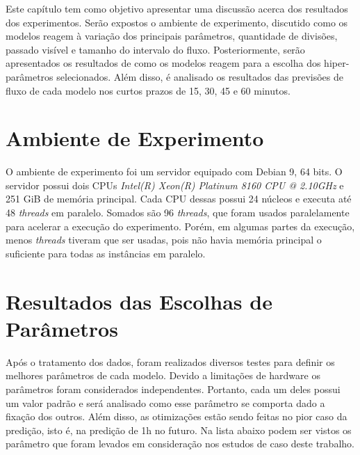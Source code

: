 Este capítulo tem como objetivo apresentar uma discussão acerca dos resultados dos experimentos. Serão expostos o ambiente de experimento, discutido como os modelos reagem à variação dos principais parâmetros, quantidade de divisões, passado visível e tamanho do intervalo do fluxo. Posteriormente, serão apresentados os resultados de como os modelos reagem para a escolha dos hiper-parâmetros selecionados. Além disso, é analisado os resultados das previsões de fluxo de cada modelo nos curtos prazos de 15, 30, 45 e 60 minutos.


\section{Ambiente de Experimento}

O ambiente de experimento foi um servidor equipado com Debian 9, 64 bits. O servidor possui dois CPUs \textit{Intel(R) Xeon(R) Platinum 8160 CPU @ 2.10GHz} e 251 GiB de memória principal. Cada CPU dessas possui 24 núcleos e executa até 48 \textit{threads} em paralelo. Somados são 96 \textit{threads}, que foram usados paralelamente para acelerar a execução do experimento. Porém, em algumas partes da execução, menos \textit{threads} tiveram que ser usadas, pois não havia memória principal o suficiente para todas as instâncias em paralelo.

\section{Resultados das Escolhas de Parâmetros}
\label{section:resultados_parametros}

Após o tratamento dos dados, foram realizados diversos testes para definir os melhores parâmetros de cada modelo. Devido a limitações de hardware os parâmetros foram considerados independentes. Portanto, cada um deles possui um valor padrão e será analisado como esse parâmetro se comporta dado a fixação dos outros. Além disso, as otimizações estão sendo feitas no pior caso da predição, isto é, na predição de 1h no futuro. Na lista abaixo podem ser vistos os parâmetro que foram levados em consideração nos estudos de caso deste trabalho.

